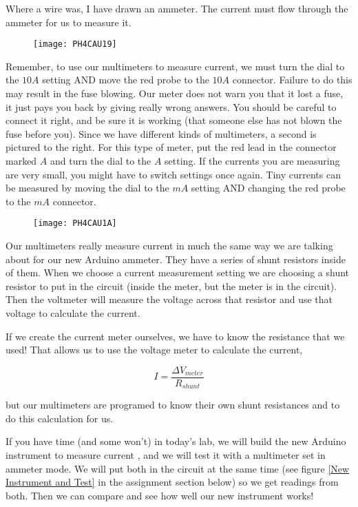 Where a wire was, I have drawn an ammeter. The current must flow through the ammeter for us to measure it.

\begin{figure}[h!]
	\centering
    \texttt{[image: PH4CAU19]}
\end{figure} 

Remember, to use our multimeters to measure current, we must turn the dial to the $10\unit{A}$ setting AND move the red probe to the $10\unit{A}$ connector. Failure to do this may result in the fuse blowing. Our meter does not warn you that it lost a fuse, it just pays you back by giving really wrong answers. You should be careful to connect it right, and be sure it is working (that someone else has not blown the fuse before you). Since we have different kinds of multimeters, a
second is pictured to the right. For this type of meter, put the red lead in the connector marked $A$ and turn the dial to the $A$ setting. If the currents you are measuring are very small, you might have to switch settings once again. Tiny currents can be measured by moving the dial to the $\unit{mA}$ setting AND changing the red probe to the $\unit{mA}$ connector.

\begin{figure}[h!]
	\centering
    \texttt{[image: PH4CAU1A]}
\end{figure}

Our multimeters really measure current in much the same way we are talking about for our new Arduino ammeter. They have a series of shunt resistors inside of them. When we choose a current measurement setting we are choosing a shunt resistor to put in the circuit (inside the meter, but the meter is in the circuit). Then the voltmeter will measure the voltage across that resistor and use that voltage to calculate the current.

If we create the current meter ourselves, we have to know the resistance that we used! That allows us to use the voltage meter to calculate the current,

\begin{equation*}
	I=\frac{\Delta V_{meter}}{R_{shunt}}
\end{equation*}

but our multimeters are programed to know their own shunt resistances and to do this calculation for us.

If you have time (and some won't) in today's lab, we will build the new Arduino instrument to measure current , and we will test it with a multimeter set in ammeter mode. We will put both in the circuit at the same time (see figure \ref{New Instrument and Test} in the assignment section below) so we get readings from both. Then we can compare and see how well our new instrument works!

